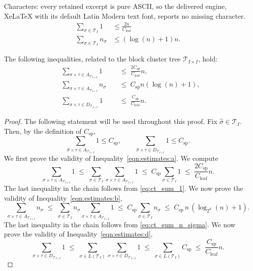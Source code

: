 \documentclass[10pt,a4paper]{amsart}
\newcommand{\mc}[1]{\mathcal{#1}}
\begin{document}
Characters: every retained excerpt is pure ASCII, so the delivered engine, XeLaTeX with its default Latin Modern text font, reports no missing character.
\begin{align}
    \sum_{\sigma \in \mathcal{T}_{I}} 1 & \le \frac{2n}{C_{\text{leaf}}} \label{eq:ct_sum_1} \\
    \sum_{\sigma \in \mathcal{T}_{I}} n_{\sigma} & \le (\log(n) + 1)n. \label{eq:ct_sum_n_sigma}
\end{align}

\begin{lemma}\label{lem:bc_estimates}
The following inequalities, related to the block cluster tree $\mc{T}_{I \times I}$, hold:
\begin{subequations}\label{eqn:estimates}
\begin{alignat}{2}
&\sum_{\sigma \times \tau \in A_{\mc{T}_{I \times I}}} 1
&&\;\le\; \frac{2C_{\text{sp}}}{C_{\text{leaf}}} n, \label{eqn:estimates:a} \\[2pt]
&\sum_{\sigma \times \tau \in A_{\mc{T}_{I \times I}}} n_{\sigma}
&&\;\le\; C_{\text{sp}} n (\log(n) + 1), \label{eqn:estimates:b} \\[2pt]
&\sum_{\sigma \times \tau \in D_{\mc{T}_{I \times I}}} 1
&&\;\le\; \frac{C_{\text{sp}}}{C_{\text{leaf}}} n . \label{eqn:estimates:d}
\end{alignat}
\end{subequations}
\end{lemma}

\begin{proof}
The following statement will be used throughout this proof. Fix $\hat{\sigma} \in \mc{T}_{I}$. Then, by the definition of $C_{\text{sp}}$,
\[
  \sum_{\hat{\sigma} \times \tau \in A_{\mc{T}_{I \times I}}} 1 \le C_{\text{sp}}, 
  \qquad 
  \sum_{\hat{\sigma} \times \tau \in D_{\mc{T}_{I \times I}}} 1 \le C_{\text{sp}} .
\]
We first prove the validity of Inequality~\eqref{eqn:estimates:a}. We compute
\[
  \sum_{\sigma \times \tau \in A_{\mc{T}_{I \times I}}} 1 
  \;\le\; \sum_{\sigma \in \mc{T}_{I}} \sum_{\sigma \times \tau \in A_{\mc{T}_{I \times I}}} 1
  \;\le\; C_{\text{sp}} \sum_{\sigma \in \mc{T}_{I}} 1
  \;\le\; \frac{2C_{\text{sp}}}{C_{\text{leaf}}} n .
\]
The last inequality in the chain follows from \eqref{eq:ct_sum_1}.
We now prove the validity of Inequality~\eqref{eqn:estimates:b},
\[
  \sum_{\sigma \times \tau \in A_{\mc{T}_{I \times I}}} n_{\sigma} 
  \;\le\; \sum_{\sigma \in \mc{T}_{I}} n_{\sigma} 
  \sum_{\sigma \times \tau \in A_{\mc{T}_{I \times I}}} 1
  \;\le\; C_{\text{sp}} \sum_{\sigma \in \mc{T}_{I}} n_{\sigma} 
  \;\le\; C_{\text{sp}} \, n \,(\log_{2^d}(n) + 1) .
\]
The last inequality in the chain follows from \eqref{eq:ct_sum_n_sigma}.
We now prove the validity of Inequality~\eqref{eqn:estimates:d},
\[
  \sum_{\sigma \times \tau \in D_{\mc{T}_{I \times I}}} 1
  \;\le\; \sum_{\sigma \in L(\mc{T}_{I})} 
  \sum_{\sigma \times \tau \in D_{\mc{T}_{I \times I}}} 1
  \;\le\; \sum_{\sigma \in L(\mc{T}_{I})} C_{\text{sp}}
  \;\le\; \frac{C_{\text{sp}}}{C_{\text{leaf}}} n .
\]
\end{proof}
\end{document}
